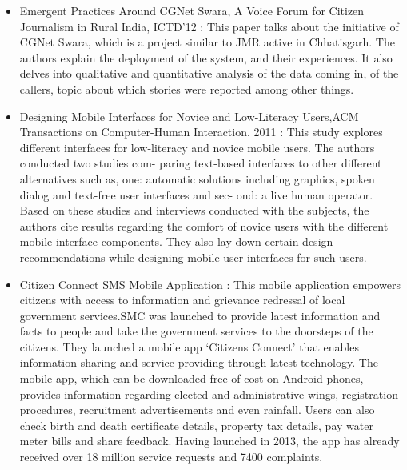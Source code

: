 \begin{itemize}

\item Emergent Practices Around CGNet Swara, A Voice Forum for Citizen Journalism
in Rural India, ICTD’12 \cite{cgnet} : This paper talks about the initiative of CGNet Swara,
which is a project similar to JMR active in Chhatisgarh. The authors explain the
deployment of the system, and their experiences. It also delves into qualitative
and quantitative analysis of the data coming in, of the callers, topic about which
stories were reported among other things.

\item Designing Mobile Interfaces for Novice and Low-Literacy Users,ACM Transactions
on Computer-Human Interaction. 2011 \cite{design}: This study explores different interfaces
for low-literacy and novice mobile users. The authors conducted two studies com-
paring text-based interfaces to other different alternatives such as, one: automatic
solutions including graphics, spoken dialog and text-free user interfaces and sec-
ond: a live human operator. Based on these studies and interviews conducted
with the subjects, the authors cite results regarding the comfort of novice users
with the different mobile interface components. They also lay down certain design
recommendations while designing mobile user interfaces for such users.

\item Citizen Connect SMS Mobile Application \cite{Decen5:online} : This mobile application empowers citizens with access to information and grievance redressal of local government services.SMC was launched to provide latest information and facts to people and take the government services to the doorsteps of the citizens. They launched a mobile app ‘Citizens Connect’ that enables information sharing and service providing through latest technology.  The mobile app, which can be downloaded free of cost on Android phones, provides information regarding elected and administrative wings, registration procedures, recruitment advertisements and even rainfall. Users can also check birth and death certificate details, property tax details, pay water meter bills and share feedback. Having launched in 2013, the app has already received over 18 million service requests and 7400 complaints.



\end{itemize}
